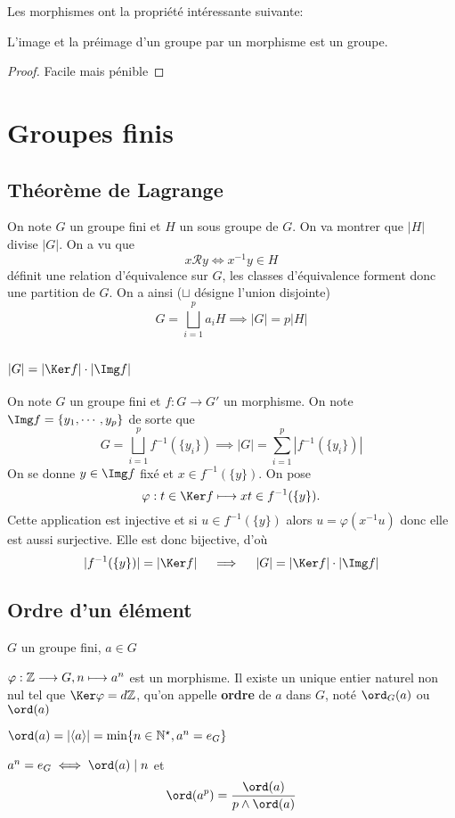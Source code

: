 Les morphismes ont la propriété intéressante suivante:

\begin{prop}
    L'image et la préimage d'un groupe par un morphisme est un groupe.
\end{prop}

\begin{proof}
    Facile mais pénible
\end{proof}

\section{Groupes finis}

\subsection{Théorème de Lagrange}


On note $G$ un groupe fini et $H$ un sous groupe de $G$. On va montrer que $|H|$ divise $|G|$. On a vu que \[
    x\mathcal Ry\iff x^{-1}y\in H
\]
définit une relation d'équivalence sur $G$, les classes d'équivalence forment donc une partition de $G$. On a ainsi ($\sqcup$ désigne l'union disjointe) \[
    G=\bigsqcup_{i=1}^p a_iH \implies |G|=p|H|
\]

\subsection{\texorpdfstring{$|G|=|\Ker f|\cdot |\Img f|$}{\#G=\#Ker f × \#Im f}}

On note $G$ un groupe fini et $f:G\to G'$ un morphisme. On note $\Img f=\{y_1, \cdots, y_p\}$ de sorte que \[
    G=\bigsqcup_{i=1}^p f^{-1}(\{y_i\}) \implies |G|=\sum_{i=1}^p \left| f^{-1}(\{y_i\}) \right|
\]
On se donne $y\in \Img f$ fixé et $x\in f^{-1}(\{y\})$. On pose \[
    \varphi: t\in \Ker f\longmapsto xt\in f^{-1}(\{y\}).
\]
Cette application est injective et si $u\in f^{-1}(\{y\})$ alors $u=\varphi(x^{-1}u)$ donc elle est aussi surjective. Elle est donc bijective, d'où \[
    |f^{-1}(\{y\})|=|\Ker f|\quad \implies \quad |G|=|\Ker f|\cdot |\Img f|
\]

\subsection{Ordre d'un élément}

\begin{defprop}
    \Hyp $G$ un groupe fini, $a\in G$
    \begin{concenum}
    \item $\varphi:\mathbb Z\longrightarrow G, n\longmapsto a^n$ est un morphisme. Il existe un unique entier naturel non nul tel que $\Ker \varphi=d\Z$, qu'on appelle \textbf{ordre} de $a$ dans $G$, noté $\ord_G (a)$ ou $\ord (a)$
    \item $\ord (a)=|\langle a\rangle|=\min\{n\in\N^\star, a^n=e_G\}$
    \item $a^n=e_G \iff \ord(a)\;|\; n$ et \[
            \ord(a^p)=\frac{\ord (a)}{p\land \ord (a)}
        \]
    \end{concenum}
\end{defprop}

